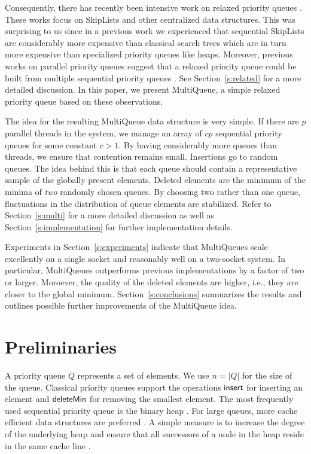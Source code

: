 \documentclass[a4paper,12pt]{article}
\newcommand{\Id}[1]{\ensuremath{\text{{\sf #1}}}}
\begin{document}
Consequently, there has recently been intensive work on relaxed priority queues \cite{AKLS14,WVTCT14,HKPSS13}. These works focus on SkipLists and other centralized data structures.  This was surprising to us since in a previous work we experienced that sequential SkipLists are considerably more expensive than classical search trees \cite{DKMS04} which are in turn more expensive than specialized priority queues like heaps. Moreover, previous works on parallel priority queues suggest that a relaxed priority queue could be built from multiple sequential priority queues \cite{DeoPra92,RanEtAl94,San98a}. See Section~\ref{s:related} for a more detailed discussion. In this paper, we present MultiQueue, a simple relaxed priority queue based on these observations. 

The idea for the resulting MultiQueue data structure is very simple.
If there are $p$ parallel threads in the system, we manage an array of $cp$ sequential priority queues for some constant $c>1$. By having considerably more queues than threads, we ensure that contention remains small. Insertions go to random queues. The idea behind this is that each queue should contain a representative sample of the globally present elements. Deleted elements are the minimum of the minima of \emph{two} randomly chosen queues. By choosing two rather than one queue, fluctuations in the distribution of queue elements are stabilized. Refer to Section~\ref{s:multi} for a more detailed discussion as well as Section~\ref{s:implementation} for further implementation details.

Experiments in Section~\ref{s:experiments} indicate that MultiQueues scale excellently on a single socket and reasonably well on a two-socket system. 
In particular, MultiQueues outperforms previous implementations by a factor of two or larger. Moroever, the quality of the deleted elements are higher, i.e., they are closer to the global minimum.
Section~\ref{s:conclusions} summarizes the results and outlines possible further improvements of the MultiQueue idea.


\section{Preliminaries}
\label{s:prelim}

A priority queue $Q$ represents a set of elements. We use $n=|Q|$ for the size of the queue. Classical priority queues support the operations \Id{insert} for inserting an element and \Id{deleteMin} for removing the smallest element. 
The most frequently used sequential priority queue is the binary heap \cite{Wil64}. For large queues, more cache efficient data structures are preferred
\cite{LaMLad97a,San00b}. A simple measure is to increase the degree of the underlying heap and ensure that all successors of a node in the heap reside in the same cache line \cite{LaMLad97a}.
\end{document}
